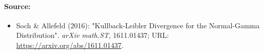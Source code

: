 \paragraph{Source:}
\begin{itemize}
\item Soch \& Allefeld (2016): "Kullback-Leibler Divergence for the Normal-Gamma Distribution". \textit{arXiv math.ST}, 1611.01437; URL: \url{https://arxiv.org/abs/1611.01437}.
\end{itemize}



